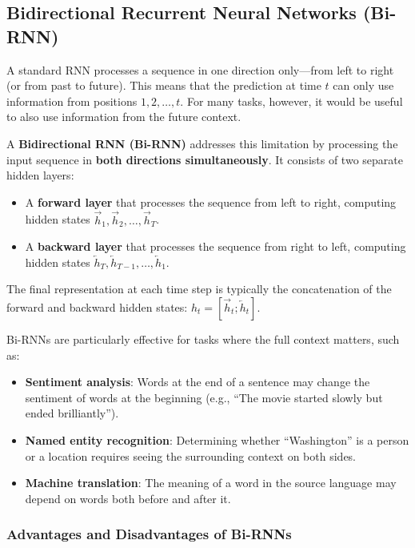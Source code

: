 \documentclass[11pt,a4paper]{article}
\begin{document}
\subsection{Bidirectional Recurrent Neural Networks (Bi-RNN)}

A standard RNN processes a sequence in one direction only---from left to right (or from past to future). This means that the prediction at time $t$ can only use information from positions $1, 2, \ldots, t$. For many tasks, however, it would be useful to also use information from the future context.

A \textbf{Bidirectional RNN (Bi-RNN)} addresses this limitation by processing the input sequence in \textbf{both directions simultaneously}. It consists of two separate hidden layers:
\begin{itemize}
    \item A \textbf{forward layer} that processes the sequence from left to right, computing hidden states $\overrightarrow{h}_1, \overrightarrow{h}_2, \ldots, \overrightarrow{h}_T$.
    \item A \textbf{backward layer} that processes the sequence from right to left, computing hidden states $\overleftarrow{h}_T, \overleftarrow{h}_{T-1}, \ldots, \overleftarrow{h}_1$.
\end{itemize}

The final representation at each time step is typically the concatenation of the forward and backward hidden states: $h_t = [\overrightarrow{h}_t; \overleftarrow{h}_t]$.

Bi-RNNs are particularly effective for tasks where the full context matters, such as:
\begin{itemize}
    \item \textbf{Sentiment analysis}: Words at the end of a sentence may change the sentiment of words at the beginning (e.g., ``The movie started slowly but ended brilliantly'').
    \item \textbf{Named entity recognition}: Determining whether ``Washington'' is a person or a location requires seeing the surrounding context on both sides.
    \item \textbf{Machine translation}: The meaning of a word in the source language may depend on words both before and after it.
\end{itemize}

\subsubsection{Advantages and Disadvantages of Bi-RNNs}
\end{document}
